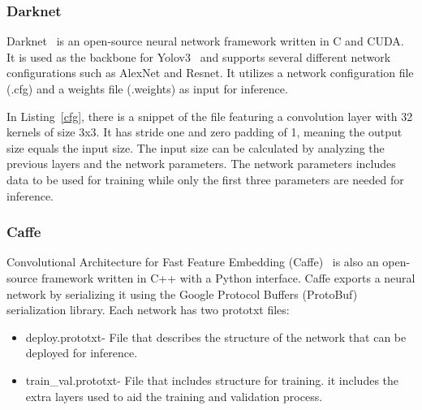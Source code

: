 \documentclass[conference]{IEEEtran}
\begin{document}
\subsubsection{Darknet}

Darknet~\cite{Darknet} is an open-source neural network framework written in C
and CUDA. It is used as the backbone for Yolov3~\cite{yolov3} and supports
several different network configurations such as AlexNet and Resnet.  It
utilizes a network configuration file (.cfg) and a weights file (.weights) as
input for inference.

\begin{figure}[!htb]

\end{figure}

In Listing~\ref{cfg}, there is a snippet of the file featuring a convolution
layer with 32 kernels of size 3x3. It has stride one and zero padding of 1,
meaning the output size equals the input size. The input size can be
calculated by analyzing the previous layers and the network parameters. The
network parameters includes data to be used for training while only
the first three parameters are needed for inference.

% 


\subsubsection{Caffe}

Convolutional Architecture for Fast Feature Embedding (Caffe)~\cite{caffe} is
also an open-source framework written in C++ with a Python interface.  Caffe
exports a neural network by serializing it using the Google Protocol Buffers
(ProtoBuf) serialization library. Each network has two prototxt files:
\begin{itemize}
    \item deploy.prototxt- File that describes the structure of the network that
      can be deployed for inference.
    \item train\_val.prototxt- File that includes structure for training.  it
      includes the extra layers used to aid the training and validation process.
\end{itemize}
\end{document}
